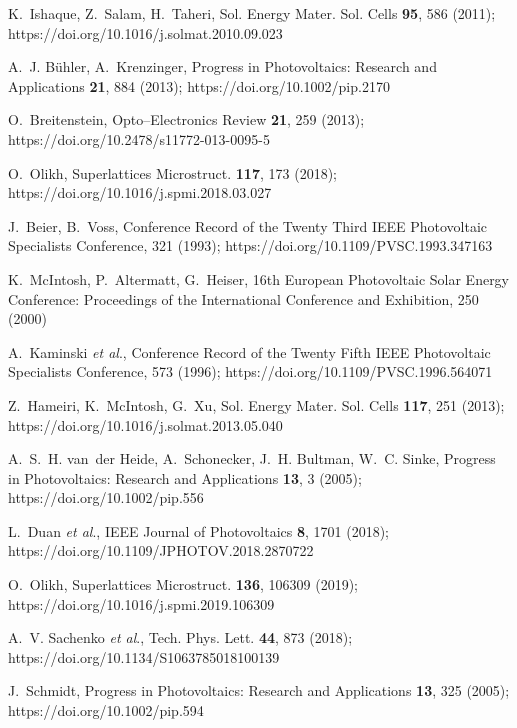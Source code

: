 \documentclass[12pt]{article}
\begin{document}
\begin{thebibliography}{99}

K.~Ishaque, Z.~Salam, H.~Taheri, Sol. Energy Mater. Sol. Cells \textbf{95}, 586 (2011);
  https://doi.org/10.1016/j.solmat.2010.09.023

A.~J. B\"{u}hler, A.~Krenzinger, Progress in Photovoltaics:
  Research and Applications \textbf{21}, 884 (2013);
 https://doi.org/10.1002/pip.2170

O.~Breitenstein, Opto--Electronics Review \textbf{21}, 259 (2013);
https://doi.org/10.2478/s11772-013-0095-5

O.~Olikh, Superlattices Microstruct. \textbf{117}, 173 (2018);
https://doi.org/10.1016/j.spmi.2018.03.027

J.~{Beier}, B.~{Voss}, Conference Record of the Twenty Third IEEE Photovoltaic
  Specialists Conference, 321 (1993);
https://doi.org/10.1109/PVSC.1993.347163

K.~McIntosh, P.~Altermatt, G.~Heiser, 16th European Photovoltaic
  Solar Energy Conference: Proceedings of the International Conference and
  Exhibition, 250 (2000)

A.~{Kaminski} \emph{et al}., Conference Record of the Twenty Fifth IEEE Photovoltaic Specialists Conference, 573 (1996);
https://doi.org/10.1109/PVSC.1996.564071

Z.~Hameiri, K.~McIntosh, G.~Xu, Sol. Energy Mater.
  Sol. Cells \textbf{117}, 251 (2013);
https://doi.org/10.1016/j.solmat.2013.05.040

A.~S.~H. van~der Heide, A.~Schonecker, J.~H. Bultman, W.~C. Sinke, Progress
  in Photovoltaics: Research and Applications \textbf{13}, 3 (2005);
https://doi.org/10.1002/pip.556

L.~{Duan}  \emph{et al}., IEEE Journal of
  Photovoltaics \textbf{8}, 1701 (2018);
https://doi.org/10.1109/JPHOTOV.2018.2870722

O.~Olikh, Superlattices Microstruct. \textbf{136}, 106309 (2019);
https://doi.org/10.1016/j.spmi.2019.106309

A.~V. Sachenko \emph{et al}., Tech. Phys. Lett. \textbf{44}, 873  (2018);
https://doi.org/10.1134/S1063785018100139

J.~Schmidt, Progress in Photovoltaics: Research and
  Applications \textbf{13}, 325 (2005);
https://doi.org/10.1002/pip.594


\end{thebibliography}
\end{document}
